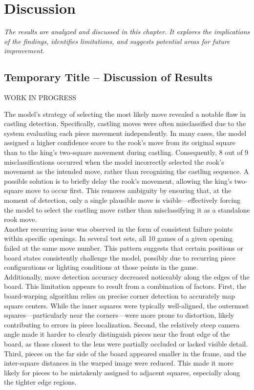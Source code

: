 \chapter{Discussion}

\begin{center}
    \textit{The results are analyzed and discussed in this chapter. It explores the implications of the findings, identifies limitations, and suggests potential areas for future improvement.}
\end{center}

\section{Temporary Title – Discussion of Results}

WORK IN PROGRESS

The model’s strategy of selecting the most likely move revealed a notable flaw in castling detection. Specifically, castling moves were often misclassified due to the system evaluating each piece movement independently. In many cases, the model assigned a higher confidence score to the rook's move from its original square than to the king’s two-square movement during castling. Consequently, 8 out of 9 misclassifications occurred when the model incorrectly selected the rook’s movement as the intended move, rather than recognizing the castling sequence. A possible solution is to briefly delay the rook’s movement, allowing the king’s two-square move to occur first. This removes ambiguity by ensuring that, at the moment of detection, only a single plausible move is visible—effectively forcing the model to select the castling move rather than misclassifying it as a standalone rook move. \\

Another recurring issue was observed in the form of consistent failure points within specific openings. In several test sets, all 10 games of a given opening failed at the same move number. This pattern suggests that certain positions or board states consistently challenge the model, possibly due to recurring piece configurations or lighting conditions at those points in the game. \\

Additionally, move detection accuracy decreased noticeably along the edges of the board. This limitation appears to result from a combination of factors. First, the board-warping algorithm relies on precise corner detection to accurately map square centers. While the inner squares were typically well-aligned, the outermost squares—particularly near the corners—were more prone to distortion, likely contributing to errors in piece localization. Second, the relatively steep camera angle made it harder to clearly distinguish pieces near the front edge of the board, as those closest to the lens were partially occluded or lacked visible detail. Third, pieces on the far side of the board appeared smaller in the frame, and the inter-square distances in the warped image were reduced. This made it more likely for pieces to be mistakenly assigned to adjacent squares, especially along the tighter edge regions. \\

